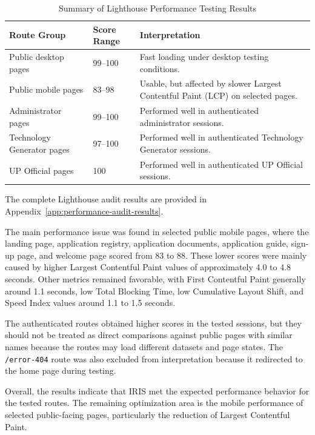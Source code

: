\begingroup
\setlength{\tabcolsep}{6pt}
\renewcommand{\arraystretch}{1.12}
\small
\begin{table}[H]
\centering
\captionsetup{justification=raggedright,singlelinecheck=false}
\caption{Summary of Lighthouse Performance Testing Results}
\label{tab:performance-results-summary}
\begin{tabular}{|p{}|p{}|p{}|}
\hline
\textbf{Route Group} & \textbf{Score Range} & \textbf{Interpretation} \\
\hline
Public desktop pages & 99--100 & Fast loading under desktop testing conditions. \\
\hline
Public mobile pages & 83--98 & Usable, but affected by slower Largest Contentful Paint (LCP) on selected pages. \\
\hline
Administrator pages & 99--100 & Performed well in authenticated administrator sessions. \\
\hline
Technology Generator pages & 97--100 & Performed well in authenticated Technology Generator sessions. \\
\hline
UP Official pages & 100 & Performed well in authenticated UP Official sessions. \\
\hline
\end{tabular}
\end{table}
\endgroup

\FloatBarrier

The complete Lighthouse audit results are provided in Appendix~\ref{app:performance-audit-results}.

The main performance issue was found in selected public mobile pages, where the landing page, application registry, application documents, application guide, sign-up page, and welcome page scored from 83 to 88. These lower scores were mainly caused by higher Largest Contentful Paint values of approximately 4.0 to 4.8 seconds. Other metrics remained favorable, with First Contentful Paint generally around 1.1 seconds, low Total Blocking Time, low Cumulative Layout Shift, and Speed Index values around 1.1 to 1.5 seconds.

The authenticated routes obtained higher scores in the tested sessions, but they should not be treated as direct comparisons against public pages with similar names because the routes may load different datasets and page states. The \texttt{/error-404} route was also excluded from interpretation because it redirected to the home page during testing.

Overall, the results indicate that IRIS met the expected performance behavior for the tested routes. The remaining optimization area is the mobile performance of selected public-facing pages, particularly the reduction of Largest Contentful Paint.

